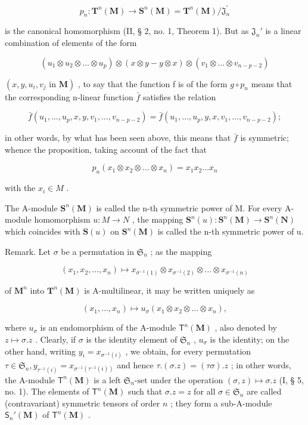 \[
p _ {n} \colon \mathbf {T} ^ {n} (\mathbf {M}) \rightarrow \mathbf {S} ^ {n} (\mathbf {M}) = \mathbf {T} ^ {n} (\mathbf {M}) / \mathfrak {J} _ {n} ^ {\prime}
\]

is the canonical homomorphism (II, § 2, no. 1, Theorem 1). But as \(\mathfrak{J}_n'\) is a linear combination of elements of the form

\[
\left(u _ {1} \otimes u _ {2} \otimes \dots \otimes u _ {p}\right) \otimes (x \otimes y - y \otimes x) \otimes \left(v _ {1} \otimes \dots \otimes v _ {n - p - 2}\right)
\]

\((x, y, u_{i}, v_{j} \text{ in } \mathbf{M})\) , to say that the function f is of the form \(g \circ p_{n}\) means that the corresponding n-linear function \(\bar{f}\) satisfies the relation

\[
\bar {f} (u _ {1}, \dots , u _ {p}, x, y, v _ {1}, \dots , v _ {n - p - 2}) = \bar {f} (u _ {1}, \dots , u _ {p}, y, x, v _ {1}, \dots , v _ {n - p - 2});
\]

in other words, by what has been seen above, this means that \(\bar{f}\) is symmetric; whence the proposition, taking account of the fact that

\[
p _ {n} (x _ {1} \otimes x _ {2} \otimes \dots \otimes x _ {n}) = x _ {1} x _ {2} \dots x _ {n}
\]

with the \(x_{i} \in M\) .

The A-module \(\mathbf{S}^{n}(\mathbf{M})\) is called the n-th symmetric power of M. For every A-module homomorphism \(u: M \to N\) , the mapping \(\mathbf{S}^{n}(u): \mathbf{S}^{n}(\mathbf{M}) \to \mathbf{S}^{n}(\mathbf{N})\) which coincides with \(\mathbf{S}(u)\) on \(\mathbf{S}^{n}(\mathbf{M})\) is called the n-th symmetric power of u.

Remark. Let \(\sigma\) be a permutation in \(\mathfrak{S}_n\) ; as the mapping

\[
\left(x _ {1}, x _ {2}, \dots , x _ {n}\right) \mapsto x _ {\sigma^ {- 1} (1)} \otimes x _ {\sigma^ {- 1} (2)} \otimes \dots \otimes x _ {\sigma^ {- 1} (n)}
\]

of \(\mathbf{M}^n\) into \(\mathbf{T}^n (\mathbf{M})\) is A-multilinear, it may be written uniquely as

\[
(x _ {1}, \dots , x _ {n}) \mapsto u _ {\sigma} (x _ {1} \otimes x _ {2} \otimes \dots \otimes x _ {n}),
\]

where \(u_{\sigma}\) is an endomorphism of the A-module \(\mathsf{T}^n(\mathbf{M})\) , also denoted by \(z \mapsto \sigma. z\) . Clearly, if \(\sigma\) is the identity element of \(\mathfrak{S}_n\) , \(u_{\sigma}\) is the identity; on the other hand, writing \(y_i = x_{\sigma^{-1}(i)}\) , we obtain, for every permutation \(\tau \in \mathfrak{S}_n, y_{\tau^{-1}(i)} = x_{\sigma^{-1}(\tau^{-1}(i))}\) and hence \(\tau. (\sigma. z) = (\tau \sigma). z\) ; in other words, the A-module \(\mathsf{T}^n(\mathbf{M})\) is a left \(\mathfrak{S}_n\text{-set}\) under the operation \((\sigma, z) \mapsto \sigma. z\) (I, § 5, no. 1). The elements of \(\mathsf{T}^n(\mathbf{M})\) such that \(\sigma. z = z\) for all \(\sigma \in \mathfrak{S}_n\) are called (contravariant) symmetric tensors of order \(n\) ; they form a sub-A-module \(\mathsf{S}_n'(\mathbf{M})\) of \(\mathsf{T}^n(\mathbf{M})\) .

